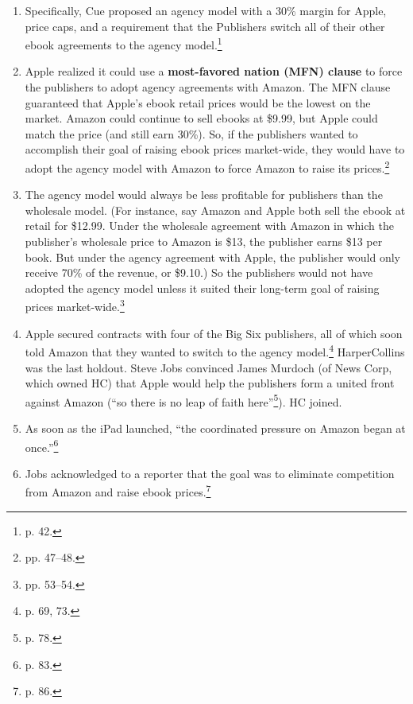 \begin{enumerate}
\begin{enumerate}
        Thus, the final component of its agency model required the Publishers to 
        move all of their e-tailers to agency.''\footnote{pp. 39--40.}
        \item Specifically, Cue proposed an agency model with a 30\% margin for 
        Apple, price caps, and a requirement that the Publishers switch all of 
        their other ebook agreements to the agency model.\footnote{p. 42.}
        \item Apple realized it could use a \textbf{most-favored nation (MFN) 
        clause} to force the publishers to adopt agency agreements with Amazon.  
        The MFN clause guaranteed that Apple's ebook retail prices would be the 
        lowest on the market. Amazon could continue to sell ebooks at \$9.99, 
        but Apple could match the price (and still earn 30\%). So, if the 
        publishers wanted to accomplish their goal of raising ebook prices 
        market-wide, they would have to adopt the agency model with Amazon to 
        force Amazon to raise its prices.\footnote{pp. 47--48.}
        \item The agency model would always be less profitable for publishers 
        than the wholesale model. (For instance, say Amazon and Apple both sell 
        the ebook at retail for \$12.99. Under the wholesale agreement with 
        Amazon in which the publisher's wholesale price to Amazon is \$13, the 
        publisher earns \$13 per book. But under the agency agreement with 
        Apple, the publisher would only receive 70\% of the revenue, or \$9.10.) 
        So the publishers would not have adopted the agency model unless it 
        suited their long-term goal of raising prices market-wide.\footnote{pp. 
        53--54.}
        \item Apple secured contracts with four of the Big Six publishers, all 
        of which soon told Amazon that they wanted to switch to the agency 
        model.\footnote{p. 69, 73.} HarperCollins was the last holdout. Steve 
        Jobs convinced James Murdoch (of News Corp, which owned HC) that
        Apple would help the publishers form a united front against Amazon (``so 
        there is no leap of faith here''\footnote{p. 78.}). HC joined.
        \item As soon as the iPad launched, ``the coordinated pressure on Amazon 
        began at once.''\footnote{p. 83.}
        \item Jobs acknowledged to a reporter that the goal was to eliminate 
        competition from Amazon and raise ebook prices.\footnote{p. 86.}

\end{enumerate}
\end{enumerate}
